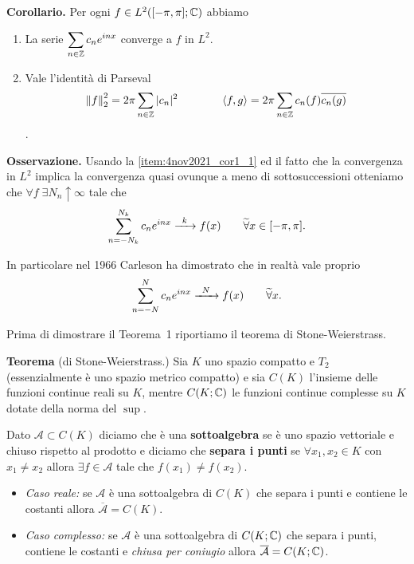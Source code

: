 \textbf{Corollario.}
Per ogni $f \in L^2([-\pi, \pi]; \mathbb C)$ abbiamo
\begin{enumerate}
	\item \label{item:4nov2021_cor1_1} 
		La serie $\displaystyle \sum_{n \in \mathbb Z} c_n e^{inx}$ converge a $f$ in $L^2$.

	\item Vale l'identità di Parseval
		$$
		\left\lVert f \right\rVert_2^2 = 2 \pi \sum_{n \in \mathbb Z} |c_n|^2
		\qquad
		\qquad
		\langle f, g \rangle = 2\pi \sum_{n \in \mathbb Z} c_n(f) \overline{c_n(g)}
		$$.
\end{enumerate}

\textbf{Osservazione.}
Usando la \ref{item:4nov2021_cor1_1} ed il fatto che la convergenza in $L^2$ implica la convergenza quasi ovunque a meno di sottosuccessioni otteniamo che $\forall f \; \exists N_n \uparrow \infty$ tale che
$$
	\sum_{n = -N_k}^{N_k} c_n e^{inx} \xrightarrow{\;\;k\;\;} f(x) \qquad \widetilde\forall x \in [-\pi, \pi].
$$

In particolare nel 1966 Carleson ha dimostrato che in realtà vale proprio
$$
	\sum_{n = -N}^N c_n e^{inx} \xrightarrow{\;\;N\;\;} f(x) \qquad \widetilde\forall x.
$$

Prima di dimostrare il Teorema~1 riportiamo il teorema di Stone-Weierstrass.

\textbf{Teorema} (di Stone-Weierstrass.)
Sia $K$ uno spazio compatto e $T_2$ (essenzialmente è uno spazio metrico compatto) e sia $C(K)$ l'insieme delle funzioni continue reali su $K$, mentre $C(K; \mathbb C)$ le funzioni continue complesse su $K$ dotate della norma del $\sup$.

Dato $\mathcal A \subset C(K)$ diciamo che è una \textbf{sottoalgebra} se è uno spazio vettoriale e chiuso rispetto al prodotto e diciamo che \textbf{separa i punti} se $\forall x_1, x_2 \in K$ con $x_1 \neq x_2$ allora $\exists f \in \mathcal A$ tale che $f(x_1) \neq f(x_2)$.
\begin{itemize}
	\item \textit{Caso reale:}
	se $\mathcal A$ è una sottoalgebra di $C(K)$ che separa i punti e contiene le costanti allora $\overline{\mathcal A} = C(K)$.
	
	\item \textit{Caso complesso:}
	se $\mathcal A$ è una sottoalgebra di $C(K; \mathbb C)$ che separa i punti, contiene le costanti e \textit{chiusa per coniugio} allora $\overline{\mathcal A} = C(K; \mathbb C)$.
	
\end{itemize}


